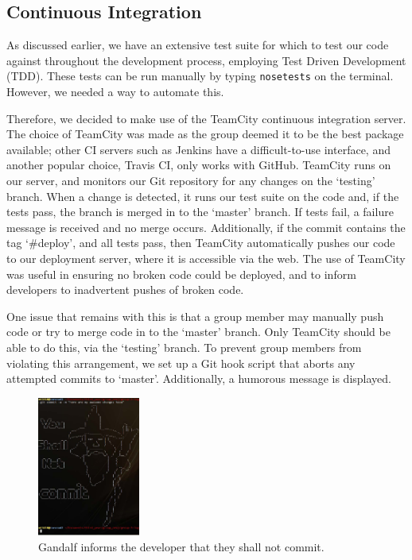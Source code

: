 \documentclass[a4paper, 11pt]{article}
\begin{document}
  \subsection{Continuous Integration}

    As discussed earlier, we have an extensive test suite for which to test our
    code against throughout the development process, employing Test Driven
    Development (TDD). These tests can be run manually by typing
    \texttt{nosetests} on the terminal. However, we needed a way to automate
    this.

    Therefore, we decided to make use of the TeamCity \cite{teamcity}
    continuous integration server. The choice of TeamCity was made as the group
    deemed it to be the best package available; other CI servers such as
    Jenkins have a difficult-to-use interface, and another popular choice,
    Travis CI, only works with GitHub. TeamCity runs on our server,
    and monitors our Git repository for any changes on the `testing' branch.
    When a change is detected, it runs our test suite on the code and, if the
    tests pass, the branch is merged in to the `master' branch. If tests fail,
    a failure message is received and no merge occurs. Additionally, if the
    commit contains the tag `\#deploy', and all tests pass, then TeamCity 
    automatically pushes our code to our deployment server, where it is 
    accessible via the web. The use of TeamCity was useful in ensuring no
    broken code could be deployed, and to inform developers to inadvertent
    pushes of broken code.

    One issue that remains with this is that a group member may manually push
    code or try to merge code in to the `master' branch. Only TeamCity should
    be able to do this, via the `testing' branch. To prevent group members from
    violating this arrangement, we set up a Git hook script that aborts any
    attempted commits to `master'. Additionally, a humorous message is
    displayed.

    \begin{figure}[H]
      \centering
      \includegraphics[width=0.3\textwidth]{images/gandalf.jpg}
      \caption{Gandalf informs the developer that they shall not commit.}
    \end{figure}
\end{document}
